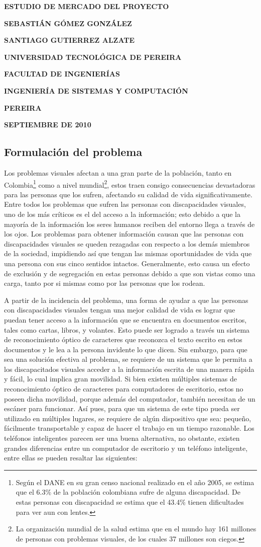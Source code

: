 \documentclass[a4paper, 12pt, oneside]{article}
\newcommand\portada{
	\begin{titlepage}
		\begin{center}
			{\large \bf ESTUDIO DE MERCADO DEL PROYECTO }
			\vfill
			{\large\bf SEBASTIÁN GÓMEZ GONZÁLEZ \par}
			{\large\bf SANTIAGO GUTIERREZ ALZATE \par}
			\vfill
			{\large\bf UNIVERSIDAD TECNOLÓGICA DE PEREIRA  \par}
			{\large\bf FACULTAD DE INGENIERÍAS \par}
			{\large\bf INGENIERÍA DE SISTEMAS Y COMPUTACIÓN \par}
			{\large\bf PEREIRA\par}
			{\large\bf SEPTIEMBRE DE 2010 \par}
		\end{center}
	\end{titlepage}
}
\begin{document}
\portada

	\tableofcontents
	\clearpage
	
	\begin{center}
	\section{Formulación del problema}
	\end{center}

	Los problemas visuales afectan a una gran parte de la población, tanto en Colombia\footnote{Según el DANE en su gran censo nacional realizado en el año 2005, se estima que el 6.3\% de la población colombiana sufre de alguna discapacidad. De estas personas con discapacidad se estima que el 43.4\% tienen dificultades para ver aun con lentes.} como a nivel mundial\footnote{La organización mundial de la salud estima que en el mundo hay 161 millones de personas con problemas visuales, de los cuales 37 millones son ciegos.}, estos traen consigo consecuencias devastadoras para las personas que los sufren, afectando su calidad de vida significativamente. Entre todos los problemas que sufren las personas con discapacidades visuales, uno de los más críticos es el del acceso a la información; esto debido a que la mayoría de la información los seres humanos reciben del entorno llega a través de los ojos. Los problemas para obtener información causan que las personas con discapacidades visuales se queden rezagadas con respecto a los demás miembros de la sociedad, impidiendo así que tengan las mismas oportunidades de vida que una persona con sus cinco sentidos intactos. Generalmente, esto causa un efecto de exclusión y de segregación en estas personas debido a que son vistas como una carga, tanto por si mismas como por las personas que los rodean. 

	A partir de la incidencia del problema, una forma de ayudar a que las personas con discapacidades visuales tengan una mejor calidad de vida es lograr que puedan tener acceso a la información que se encuentra en documentos escritos, tales como cartas, libros, y volantes. Esto puede ser logrado a través un sistema de reconocimiento óptico de caracteres que reconozca el texto escrito en estos documentos y le lea a la persona invidente lo que dicen. Sin embargo, para que sea una solución efectiva al problema, se requiere de un sistema que le permita a los discapacitados visuales acceder a la información escrita de una manera rápida y fácil, lo cual implica gran movilidad. Si bien existen múltiples sistemas de reconocimiento óptico de caracteres para computadores de escritorio, estos no poseen dicha movilidad, porque además del computador, también necesitan de un escáner para funcionar. Así pues, para que un sistema de este tipo pueda ser utilizado en múltiples lugares, se requiere de algún dispositivo que sea: pequeño, fácilmente transportable y capaz de hacer el trabajo en un tiempo razonable. Los teléfonos inteligentes parecen ser una buena alternativa, no obstante, existen grandes diferencias entre un computador de escritorio y un teléfono inteligente, entre ellas se pueden resaltar las siguientes:
	
\end{document}
